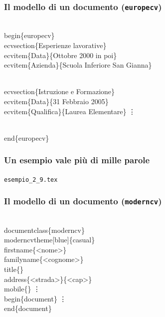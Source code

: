 \documentclass[svgnames,%
	ucs,%
	pdftex]{guitbeamer}
\begin{document}
\begin{frame}
  \frametitle{Il modello di un documento (\texttt{europecv})}
	\begin{LaTeXcode}
		\\begin\{europecv\}\n
	  \onslide<2->
		\hspace*{2ex}\alert{\\ecvsection\{}Esperienze lavorative\alert{\}}\n
	  \onslide<3->
		\hspace*{5ex}\alert{\\ecvitem\{}Data\alert{\}\{}Ottobre 2000 in poi\alert{\}}\n
		\hspace*{5ex}\alert{\\ecvitem\{}Azienda\alert{\}\{}Scuola Inferiore San Gianna\alert{\}}\n

	  \smallskip
		\hspace*{2ex}\\ecvsection\{Istruzione e Formazione\}\n
		\hspace*{5ex}\\ecvitem\{Data\}\{31 Febbraio 2005\}\n
		\hspace*{5ex}\\ecvitem\{Qualifica\}\{Laurea Elementare\}\n
		\hspace*{15ex}\vdots\n
		
	  \smallskip
		\smallskip
		\\end\{europecv\}
	\end{LaTeXcode}
\end{frame}
\begin{frame}
  \frametitle{Un esempio vale pi\`u di mille parole}
	\begin{center}
		\alert{\texttt{esempio\_2\_9.tex}}
	\end{center}
\end{frame}
\begin{frame}
  \frametitle{Il modello di un documento (\texttt{moderncv})}
	\begin{LaTeXcode}
		\\documentclass\{\alert{moderncv}\}\n
	  \onslide<2->
		\alert{\\moderncvtheme[blue]\{casual\}}\n
	  \onslide<3->
		\alert{\\firstname\{}<nome>\alert{\}}\n
		\alert{\\familyname\{}<cognome>\alert{\}}\n
		\\title\{\}\n
		\\address\{\alert{<strada>}\}\{\alert{<cap>}\}\n
		\\mobile\{\}\n
		\hspace*{10ex}\vdots\n
	  \smallskip
	  \onslide<4->
		\\begin\{document\}\n
		\smallskip
		\hspace*{10ex}\vdots\n
		\smallskip
		\\end\{document\}
	\end{LaTeXcode}
\end{frame}
\end{document}
